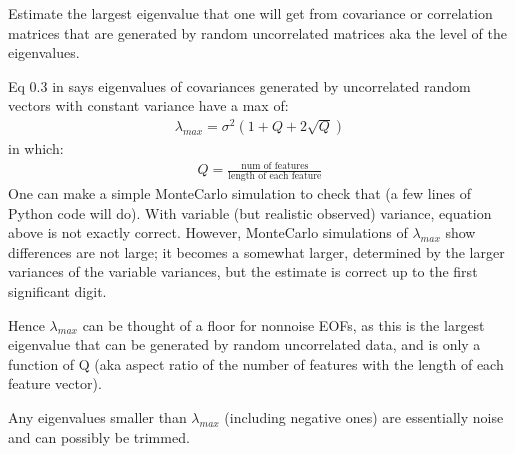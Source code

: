 \documentclass[letterpaper,10pt,english]{sphinxmanual}
\begin{document}
\begin{fulllineitems}
\label{\detokenize{misc:glomar_gridding.covariance_tools.laloux_clip}}
\pysigstartsignatures
\pysiglinewithargsret
{}
{\sphinxparamcomma {}\sphinxparamcomma {}}
{}
\pysigstopsignatures
\sphinxAtStartPar
Estimate the largest eigenvalue that one will get from covariance or
correlation matrices that are generated by random uncorrelated matrices
aka the  level of the eigenvalues.

\sphinxAtStartPar
Eq 0.3 in  says eigenvalues of covariances generated by
uncorrelated random vectors with constant variance have a max of:
\begin{equation*}
\begin{split}\lambda_{max} = \sigma^2 (1 + Q + 2 \sqrt{Q})\end{split}
\end{equation*}
\sphinxAtStartPar
in which:
\begin{equation*}
\begin{split}Q = \frac{\text{num of features}}{\text{length of each feature}}\end{split}
\end{equation*}
\sphinxAtStartPar
One can make a simple Monte\sphinxhyphen{}Carlo simulation to check that (a few lines of
Python code will do). With variable (but realistic observed) variance,
equation above is not exactly correct. However, Monte\sphinxhyphen{}Carlo simulations of
\(\lambda_{max}\) show differences are not large; it becomes a somewhat
larger, determined by the larger variances of the variable variances, but
the estimate is correct up to the first significant digit.

\sphinxAtStartPar
Hence \(\lambda_{max}\) can be thought of a floor for non\sphinxhyphen{}noise EOFs,
as this is the largest eigenvalue that can be generated by random
uncorrelated data, and is only a function of Q (aka aspect ratio
of the number of features with the length of each feature vector).

\sphinxAtStartPar
Any eigenvalues smaller than \(\lambda_{max}\) (including negative ones)
are essentially noise and can possibly be trimmed.


\end{fulllineitems}
\end{document}
